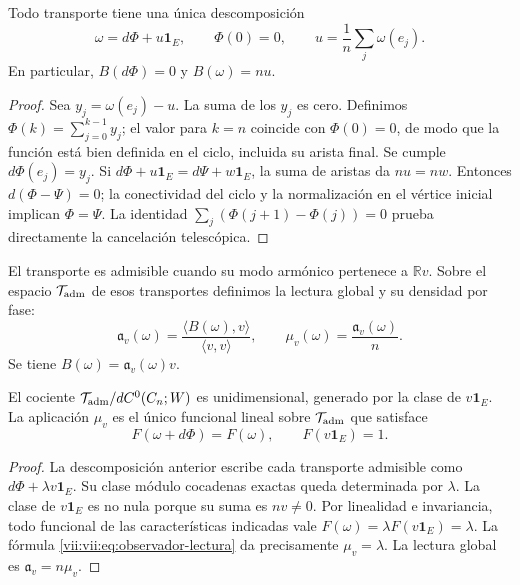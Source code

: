 \begin{theorem}
\label{vii:vii:thm:observador-descomposicion}
Todo transporte tiene una única descomposición
\[
 \omega=d\Phi+u\mathbf1_E,\qquad \Phi(0)=0,
 \qquad u=\frac1n\sum_j\omega(e_j).
\]
En particular, \(B(d\Phi)=0\) y \(B(\omega)=nu\).
\end{theorem}

\begin{proof}
Sea \(y_j=\omega(e_j)-u\). La suma de los \(y_j\) es cero.
Definimos \(\Phi(k)=\sum_{j=0}^{k-1}y_j\); el valor para \(k=n\)
coincide con \(\Phi(0)=0\), de modo que la función está bien definida
en el ciclo, incluida su arista final. Se cumple \(d\Phi(e_j)=y_j\).
Si \(d\Phi+u\mathbf1_E=d\Psi+w\mathbf1_E\), la suma de aristas da
\(nu=nw\). Entonces \(d(\Phi-\Psi)=0\); la conectividad del ciclo
y la normalización en el vértice inicial implican \(\Phi=\Psi\).
La identidad \(\sum_j(\Phi(j+1)-\Phi(j))=0\) prueba directamente
la cancelación telescópica.
\end{proof}

\begin{definition}
\label{vii:vii:def:observador-admisible}
El transporte es admisible cuando su modo armónico pertenece a
\(\mathbb Rv\). Sobre el espacio \(\mathcal T_{\rm adm}\) de esos
transportes definimos la lectura global y su densidad por fase:
\begin{equation}
 \mathfrak a_v(\omega)
 =\frac{\langle B(\omega),v\rangle}{\langle v,v\rangle},
 \qquad
 \mu_v(\omega)=\frac{\mathfrak a_v(\omega)}n.
 \label{vii:vii:eq:observador-lectura}
\end{equation}
Se tiene \(B(\omega)=\mathfrak a_v(\omega)v\).
\end{definition}

\begin{theorem}
\label{vii:vii:thm:observador-unicidad}
El cociente
\(\mathcal T_{\rm adm}/dC^0(C_n;W)\) es unidimensional, generado
por la clase de \(v\mathbf1_E\). La aplicación \(\mu_v\) es el
único funcional lineal sobre \(\mathcal T_{\rm adm}\) que satisface
\[
 F(\omega+d\Phi)=F(\omega),\qquad F(v\mathbf1_E)=1.
\]
\end{theorem}

\begin{proof}
La descomposición anterior escribe cada transporte admisible como
\(d\Phi+\lambda v\mathbf1_E\). Su clase módulo cocadenas exactas
queda determinada por \(\lambda\). La clase de \(v\mathbf1_E\)
es no nula porque su suma es \(nv\neq0\). Por linealidad e
invariancia, todo funcional de las características indicadas vale
\(F(\omega)=\lambda F(v\mathbf1_E)=\lambda\). La fórmula
\eqref{vii:vii:eq:observador-lectura} da precisamente \(\mu_v=\lambda\).
La lectura global es \(\mathfrak a_v=n\mu_v\).
\end{proof}

